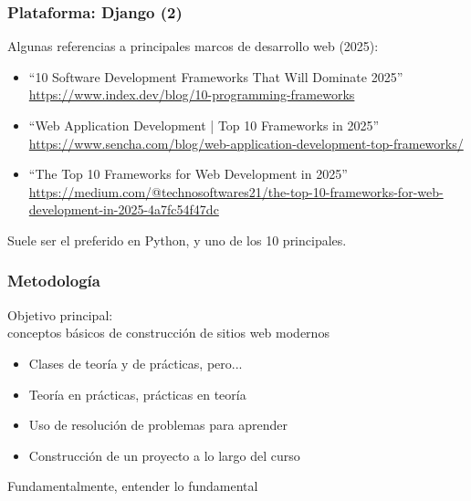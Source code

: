
\begin{frame}
\frametitle{Plataforma: Django (2)}

{\large Algunas referencias a principales marcos de desarrollo web (2025):}

\vspace{0.5cm}

\begin{itemize}
\item ``10 Software Development Frameworks That Will Dominate 2025'' \\
  {\small \url{https://www.index.dev/blog/10-programming-frameworks}}
\item ``Web Application Development | Top 10 Frameworks in 2025'' \\
  {\small \url{https://www.sencha.com/blog/web-application-development-top-frameworks/}}
\item ``The Top 10 Frameworks for Web Development in 2025'' \\
  {\small \url{https://medium.com/@technosoftwares21/the-top-10-frameworks-for-web-development-in-2025-4a7fc54f47dc}}
\end{itemize}

\vspace{1cm}
{\large Suele ser el preferido en Python, y uno de los 10 principales.}

\end{frame}


\begin{frame}
\frametitle{Metodología}

{\Large
  \begin{center}
    Objetivo principal: \\
    conceptos básicos de construcción de sitios web modernos \\
  \end{center}

  \vspace{0.5cm}
\begin{itemize}
\item Clases de teoría y de prácticas, pero...
\item Teoría en prácticas, prácticas en teoría
\item Uso de resolución de problemas para aprender
\item Construcción de un proyecto a lo largo del curso
\end{itemize}

  \vspace{0.5cm}

\begin{center}
  Fundamentalmente, entender lo fundamental
\end{center}
}
\end{frame}

